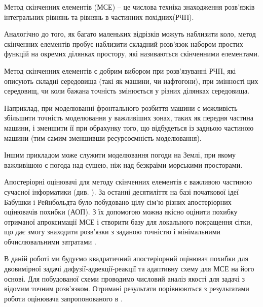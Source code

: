 

Метод скінченних елементів (МСЕ) -- це числова техніка знаходження розв'язків інтегральних рівнянь та рівнянь в частинних похідних(РЧП).

Аналогічно до того, як багато маленьких відрізків можуть наблизити коло, метод скінченних елементів пробує наблизити складний розв'язок набором простих функцій на окремих ділянках простору, які називаються скінченними елементами.

Метод скінченних елементів є добрим вибором при розв'язуванні РЧП, які описують складні середовища (такі як машини, чи нафтогони), при змінності цих середовищ, чи коли бажана точність змінюється у різних ділянках середовища.

Наприклад, при моделюванні фронтального розбиття машини є можливість збільшити точність моделювання у важливіших зонах, таких як передня частина машини, і зменшити її при обрахунку того, що відбудеться із задньою частиною машини (тим самим зменшивши ресурсоємність моделювання).

Іншим прикладом може служити моделювання погоди на Землі, при якому важливішою є погода над сушею, ніж над безкраїми морськими просторами.

Апостеріорні оцінювачі для методу скінченних елементів є важливою частиною сучасної інформатики (див. \cite{verfurth1996review, verfurth1994posteriori,eriksson1995introduction,ainsworth2011posteriori}). За останні десятиліття на базі початкової ідеї Бабушки і Рейнбольдта \cite{babuvska1978posteriori} було побудовано цілу сім'ю різних апостеріорних оцінювачів похибки (АОП). З їх допомогою можна якісно оцінити похибку отриманої апроксимації МСЕ і створити базу для локального покращення сітки, що дає змогу знаходити розв'язки з заданою точністю і мінімальними обчислювальними затратами \cite{babuska2011finite}.

В даній роботі ми будуємо квадратичний апостеріорний оцінювач похибки для двовимірної задачі дифузії-адвекції-реакції та адаптивну схему для МСЕ на його основі. Для побудованої схеми проводимо числовий аналіз якості для задачі з відомим точним розв'язком.
Отримані результати порівнюються з результатами роботи оцінювача запропонованого в \cite{OstShynAee11}.
